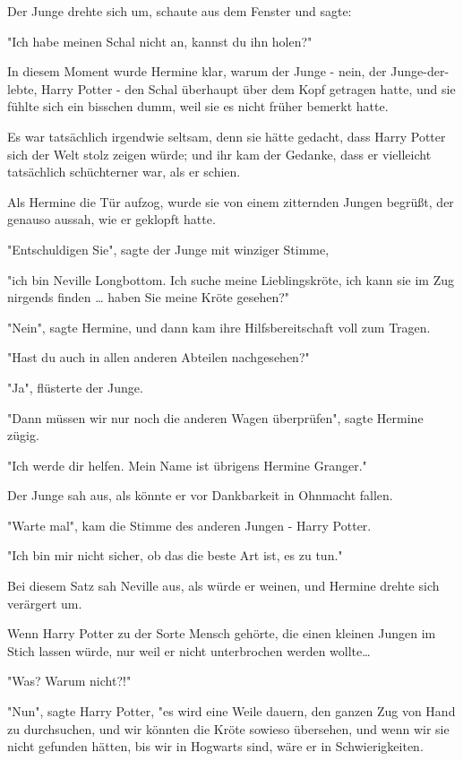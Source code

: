 {Der Junge drehte sich um, schaute aus dem Fenster und sagte:

"Ich habe meinen Schal nicht an, kannst du ihn holen?"

In diesem Moment wurde Hermine klar, warum der Junge - nein, der Junge-der-lebte, Harry Potter - den Schal überhaupt über dem Kopf getragen hatte, und sie fühlte sich ein bisschen dumm, weil sie es nicht früher bemerkt hatte.

Es war tatsächlich irgendwie seltsam, denn sie hätte gedacht, dass Harry Potter sich der Welt stolz zeigen würde; und ihr kam der Gedanke, dass er vielleicht tatsächlich schüchterner war, als er schien.

Als Hermine die Tür aufzog, wurde sie von einem zitternden Jungen begrüßt, der genauso aussah, wie er geklopft hatte.

"Entschuldigen Sie", sagte der Junge mit winziger Stimme,

"ich bin Neville Longbottom. Ich suche meine Lieblingskröte, ich kann sie im Zug nirgends finden … haben Sie meine Kröte gesehen?"

"Nein", sagte Hermine, und dann kam ihre Hilfsbereitschaft voll zum Tragen.

"Hast du auch in allen anderen Abteilen nachgesehen?"

"Ja", flüsterte der Junge.

"Dann müssen wir nur noch die anderen Wagen überprüfen", sagte Hermine zügig.

"Ich werde dir helfen. Mein Name ist übrigens Hermine Granger."

Der Junge sah aus, als könnte er vor Dankbarkeit in Ohnmacht fallen.

"Warte mal", kam die Stimme des anderen Jungen - Harry Potter.

"Ich bin mir nicht sicher, ob das die beste Art ist, es zu tun."

Bei diesem Satz sah Neville aus, als würde er weinen, und Hermine drehte sich verärgert um.

Wenn Harry Potter zu der Sorte Mensch gehörte, die einen kleinen Jungen im Stich lassen würde, nur weil er nicht unterbrochen werden wollte…

"Was? Warum nicht?!"

"Nun", sagte Harry Potter, "es wird eine Weile dauern, den ganzen Zug von Hand zu durchsuchen, und wir könnten die Kröte sowieso übersehen, und wenn wir sie nicht gefunden hätten, bis wir in Hogwarts sind, wäre er in Schwierigkeiten.

}
